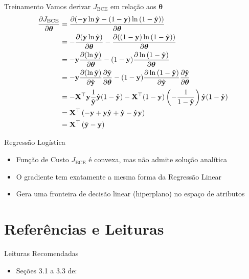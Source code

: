 \documentclass[aspectratio=169,xcolor=dvipsnames]{beamer}
\begin{document}
\begin{frame}{Treinamento}
Vamos derivar $J_{\text{BCE}}$ em relação aos $\bm{\theta}$
\begin{align*}
    \frac{\partial J_{\text{BCE}}}{\partial\bm{\theta}} &=     \frac{\partial (-\mathbf{y}\ln\hat{\mathbf{y}} -(1-\mathbf{y})\ln{(1-\hat{\mathbf{y}})})}{\partial\bm{\theta}}\\
    &= -\frac{\partial (\mathbf{y}\ln\hat{\mathbf{y}})}{\partial\bm{\theta}} -\frac{\partial((1-\mathbf{y})\ln{(1-\hat{\mathbf{y}})})}{\partial\bm{\theta}}\\
    &= -\mathbf{y}\frac{\partial (\ln\hat{\mathbf{y}})}{\partial\bm{\theta}} -(1-\mathbf{y})\frac{\partial\ln{(1-\hat{\mathbf{y}})}}{\partial\bm{\theta}}\\
    &= -\mathbf{y}\frac{\partial (\ln\hat{\mathbf{y}})}{\partial\hat{\mathbf{y}}}\frac{\partial\hat{\mathbf{y}}}{\partial\bm{\theta}} -(1-\mathbf{y})\frac{\partial\ln{(1-\hat{\mathbf{y}})}}{\partial\hat{\mathbf{y}}}\frac{\partial\hat{\mathbf{y}}}{\partial\bm{\theta}}\\
    &= -\mathbf{X}^\top\mathbf{y}\frac{1}{\hat{\mathbf{y}}}\hat{\mathbf{y}}(1-\hat{\mathbf{y}}) -\mathbf{X}^\top(1-\mathbf{y})\left(-\frac{1}{1-\hat{\mathbf{y}}}\right)\hat{\mathbf{y}}(1-\hat{\mathbf{y}})\\
    &= \mathbf{X}^\top\left(-\mathbf{y}+\mathbf{y}\hat{\mathbf{y}} +\hat{\mathbf{y}}-\hat{\mathbf{y}}\mathbf{y}\right)\\
    &= \mathbf{X}^\top\left(\hat{\mathbf{y}}-\mathbf{y}\right)\\
\end{align*}
    
\end{frame}

\begin{frame}{Regressão Logística}
\begin{itemize}
    \item Função de Custo $J_{\text{BCE}}$ é convexa, mas não admite solução analítica
    \item O gradiente tem exatamente a mesma forma da Regressão Linear
    \item Gera uma fronteira de decisão linear (hiperplano) no espaço de atributos
    \end{itemize}
    
\end{frame}

\section*{Referências e Leituras}
\begin{frame}{Leituras Recomendadas}
    \footnotesize
    \begin{itemize}
        \item Seções 3.1 a 3.3 de: 
    \end{itemize}

\end{frame}
\end{document}
